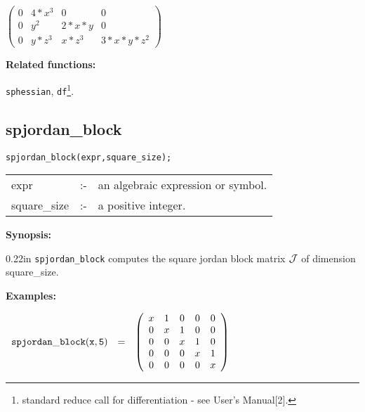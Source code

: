 \begin{flushleft}  
\hspace*{0.175in}
\begin{math}        
\left( \begin{array}{cccc} 0 & 4*x^3 & 0 & 0 \\ 0 & y^2 & 2*x*y & 0 \\ 
0 & y*z^3 & x*z^3 & 3*x*y*z^2 
\end{array} \right)
\end{math}  
\end{flushleft}

{\bf Related functions:}

\hspace*{0.175in} {\tt sphessian}, {\tt df}\footnote{standard reduce call 
for differentiation - see {\REDUCE} User's Manual[2].}.


\subsection{spjordan\_block}

\hspace*{0.175in} {\tt spjordan\_block(expr,square\_size);}

\hspace*{0.1in} 
\begin{tabular}{l l l}
expr        &:-& an algebraic expression or symbol. \\
square\_size &:-& a positive integer.
\end{tabular}

{\bf Synopsis:}

\begin{addtolength}{\leftskip}{0.22in}
{\tt spjordan\_block} computes the square jordan block matrix ${\cal J}$
                of dimension square\_size. 

\end{addtolength}

{\bf Examples:}

\begin{flushleft}  
\hspace*{0.1in}
\begin{math}        
\begin{array}{ccc}
{\tt spjordan\_block(x,5)} & = & 
\left( \begin{array}{ccccc} x & 1 & 0 & 0 & 0 \\ 0 & x & 1 & 0 & 0 \\ 0 
& 0 & x & 1 & 0 \\ 0 & 0 & 0 & x & 1 \\ 0 & 0 & 0 & 0 & x
\end{array} \right)
\end{array}
\end{math}  
\end{flushleft}

